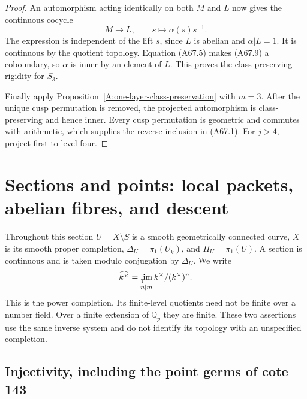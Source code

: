 \documentclass[11pt,oneside]{article}
\begin{document}
\begin{proof}
An automorphism acting identically on both
$M$ and $L$ now gives the continuous cocycle
\[
 M\longrightarrow L,\qquad
   \overline s\longmapsto\alpha(s)s^{-1}.
                                                        \tag{A67.9}
\]
The expression is independent of the
lift $s$, since $L$ is abelian and
$\alpha|L=1$. It is continuous by
the quotient topology.
Equation (A67.5) makes (A67.9) a coboundary,
so $\alpha$ is inner by an element of $L$.
This proves the class-preserving rigidity
for $S_3$.

Finally apply
Proposition~\ref{A:one-layer-class-preservation}
with $m=3$. After the unique cusp permutation
is removed, the projected automorphism is
class-preserving and hence inner.
Every cusp permutation is geometric and
commutes with arithmetic, which supplies
the reverse inclusion in (A67.1).
For $j>4$, project first to level four.
\end{proof}

\section{Sections and points: local packets, abelian fibres, and descent}
\label{sec:B}

Throughout this section $U=X\setminus S$ is a smooth geometrically connected
curve, $X$ is its smooth proper completion, $\Delta_U=\pi_1(U_{\bar k})$,
and $\Pi_U=\pi_1(U)$.  A section is continuous and is taken modulo
conjugation by $\Delta_U$.  We write
\[
 \widehat{k^\times}=\varprojlim_{n\mid m}k^\times/(k^\times)^n.
\]
This is the power completion.  Its finite-level quotients need not be finite
over a number field.  Over a finite extension of $\mathbb Q_p$ they are
finite.  These two assertions use the same inverse system and do not
identify its topology with an unspecified completion.

\subsection{Injectivity, including the point germs of cote 143}
\end{document}

